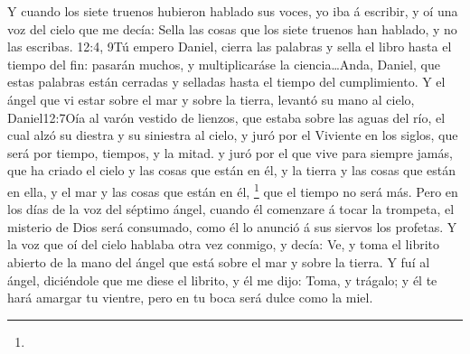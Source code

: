 Y cuando los siete truenos hubieron hablado sus voces, yo iba á escribir, y oí una voz del cielo que me decía: Sella las cosas que los siete truenos han hablado, y no las escribas.%
					{12:4, 9}{Tú empero Daniel, cierra las palabras y sella el libro hasta el tiempo del fin: pasarán muchos, y multiplicaráse la ciencia\ldots Anda, Daniel, que estas palabras están cerradas y selladas hasta el tiempo del cumplimiento.}
Y el ángel que vi estar sobre el mar y sobre la tierra, levantó su mano al cielo,%
					{Daniel}{12:7}{Oía al varón vestido de lienzos, que estaba sobre las aguas del río, el cual alzó su diestra y su siniestra al cielo, y juró por el Viviente en los siglos, que será por tiempo, tiempos, y la mitad.}
y juró por el que vive para siempre jamás, que ha criado el cielo y las cosas que están en él, y la tierra y las cosas que están en ella, y el mar y las cosas que están en él,%
	\footnote{%
	}
 que el tiempo no será más. 
Pero en los días de la voz del séptimo ángel, cuando él comenzare á tocar la trompeta, el misterio de Dios será consumado, como él lo anunció á sus siervos los profetas. 
Y la voz que oí del cielo hablaba otra vez conmigo, y decía: Ve, y toma el librito abierto de la mano del ángel que está sobre el mar y sobre la tierra.
Y fuí al ángel, diciéndole que me diese el librito, y él me dijo: Toma, y trágalo; y él te hará amargar tu vientre, pero en tu boca será dulce como la miel. 
